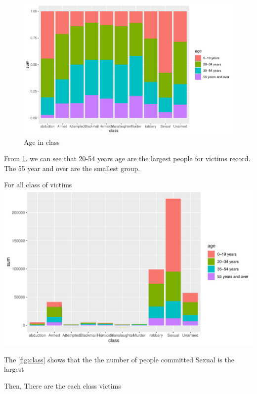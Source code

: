 \documentclass[11pt,a4paper,]{article}
\begin{document}
\begin{figure}
\centering
\includegraphics{report_files/figure-latex/agedist-1.pdf}
\caption{\label{fig:agedist}Age in class}
\end{figure}

From \ref{fig:agedist}. we can see that 20-54 years age are the largest people for victims record. The 55 year and over are the smallest group.

For all class of victims
\includegraphics{report_files/figure-latex/class-1.pdf}

The \ref{fig:class} shows that the the number of people committed Sexual is the largest

Then, There are the each class victims
\end{document}
